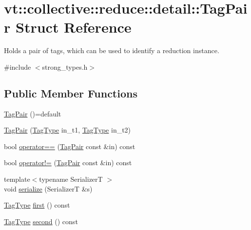 \hypertarget{structvt_1_1collective_1_1reduce_1_1detail_1_1_tag_pair}{}\section{vt\+:\+:collective\+:\+:reduce\+:\+:detail\+:\+:Tag\+Pair Struct Reference}
\label{structvt_1_1collective_1_1reduce_1_1detail_1_1_tag_pair}


Holds a pair of tags, which can be used to identify a reduction instance.  




{\ttfamily \#include $<$strong\+\_\+types.\+h$>$}

\subsection*{Public Member Functions}
\begin{DoxyCompactItemize}
\item 
\hyperlink{structvt_1_1collective_1_1reduce_1_1detail_1_1_tag_pair_a91e1f46e160d495cd07384408526656b}{Tag\+Pair} ()=default
\item 
\hyperlink{structvt_1_1collective_1_1reduce_1_1detail_1_1_tag_pair_aaab6b3334a06019160dd6451575b03aa}{Tag\+Pair} (\hyperlink{namespacevt_a84ab281dae04a52a4b243d6bf62d0e52}{Tag\+Type} in\+\_\+t1, \hyperlink{namespacevt_a84ab281dae04a52a4b243d6bf62d0e52}{Tag\+Type} in\+\_\+t2)
\item 
bool \hyperlink{structvt_1_1collective_1_1reduce_1_1detail_1_1_tag_pair_ab04262da51d82ac0ec9da44c9f453f88}{operator==} (\hyperlink{structvt_1_1collective_1_1reduce_1_1detail_1_1_tag_pair}{Tag\+Pair} const \&in) const
\item 
bool \hyperlink{structvt_1_1collective_1_1reduce_1_1detail_1_1_tag_pair_a99d3a92b554bc3972bea8fd3514c2895}{operator!=} (\hyperlink{structvt_1_1collective_1_1reduce_1_1detail_1_1_tag_pair}{Tag\+Pair} const \&in) const
\item 
{\footnotesize template$<$typename SerializerT $>$ }\\void \hyperlink{structvt_1_1collective_1_1reduce_1_1detail_1_1_tag_pair_a4b102cb93ddcca20683a431ae497ae62}{serialize} (SerializerT \&s)
\item 
\hyperlink{namespacevt_a84ab281dae04a52a4b243d6bf62d0e52}{Tag\+Type} \hyperlink{structvt_1_1collective_1_1reduce_1_1detail_1_1_tag_pair_a48b086b80a8acf1b47b4327a673de7f0}{first} () const
\item 
\hyperlink{namespacevt_a84ab281dae04a52a4b243d6bf62d0e52}{Tag\+Type} \hyperlink{structvt_1_1collective_1_1reduce_1_1detail_1_1_tag_pair_a2cc1614fe4e8c5c1798579abd0b13bdc}{second} () const
\end{DoxyCompactItemize}


